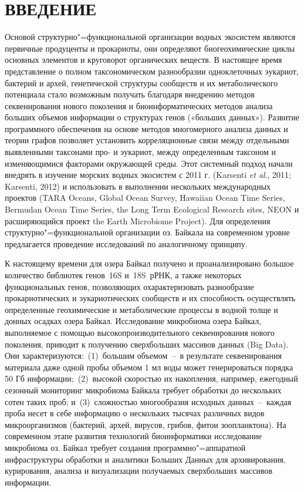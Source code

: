 \documentclass[a4paper,12pt,openany,final]{extreport}
\begin{document}
\chapter*{ВВЕДЕНИЕ}

Основой структурно"=функциональной организации водных экосистем являются первичные продуценты и прокариоты, они определяют биогеохимические циклы основных элементов и круговорот органических веществ. В настоящее время представление о полном таксономическом разнообразии одноклеточных эукариот, бактерий и архей, генетической структуры сообществ и их метаболического потенциала стало возможным получать благодаря внедрению методов секвенирования нового поколения и биоинформатических методов анализа больших объемов информации о структурах генов («больших данных»). Развитие программного обеспечения на основе методов многомерного анализа данных и теории графов позволяет установить корреляционные связи между отдельными выявленными таксонами про- и эукариот, между определенным таксоном и изменяющимися факторами окружающей среды. Этот системный подход начали внедрять в изучение морских водных экосистем с 2011 г. (Karsenti \emph{et al}., 2011; Karsenti, 2012) и использовать в выполнении нескольких международных проектов (TARA Oceans, Global Ocean Survey, Hawaiian Ocean Time Series, Bermudan Ocean Time Series, the Long Term Ecological Research sites, NEON и расширяющийся проект the Earth Microbiome Project). Для определения структурно"=функциональной организации оз. Байкала на современном уровне предлагается проведение исследований по аналогичному принципу.

К настоящему времени для озера Байкал получено и проанализировано большое количество библиотек генов~16S и~18S~рРНК, а также некоторых функциональных генов, позволяющих охарактеризовать разнообразие прокариотических и эукариотических сообществ и их способность осуществлять определенные геохимические и метаболические процессы в водной толще и донных осадках озера Байкал. Исследование микробиома озера Байкал, выполняемое с помощью высокопроизводительного секвенирования нового поколения, приводит к получению сверхбольших массивов данных (Big Data). Они характеризуются:~(1)~большим объемом~--~в результате секвенирования материала даже одной пробы объемом 1 мл воды может генерироваться порядка 50 Гб информации;~(2)~высокой скоростью их накопления, например, ежегодный сезонный мониторинг микробиома Байкала требует обработки до нескольких сотен таких проб; и~(3)~сложностью многообразия исходных данных~--~каждая проба несет в себе информацию о нескольких тысячах различных видов микроорганизмов (бактерий, архей, вирусов, грибов, фитои зоопланктона). На современном этапе развития технологий биоинформатики исследование микробиома оз. Байкал требует создания программно"=аппаратной инфраструктуры обработки и аналитики Больших Данных для архивирования, курирования, анализа и визуализации получаемых сверхбольших массивов информации.
\end{document}
